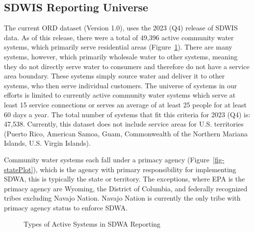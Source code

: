 \documentclass[12pt]{article}
\begin{document}
\subsection{SDWIS Reporting Universe}\label{sdwis-reporting-universe}

The current ORD dataset (Version 1.0), uses the 2023 (Q4) release of
SDWIS data. As of this release, there were a total of 49,396 active
community water systems, which primarily serve residential areas
(Figure~\ref{fig-systemType}). There are many systems, however, which
primarily wholesale water to other systems, meaning they do not directly
serve water to consumers and therefore do not have a service area
boundary. These systems simply source water and deliver it to other
systems, who then serve individual customers. The universe of systems in
our efforts is limited to currently active community water systems which
serve at least 15 service connections or serves an average of at least
25 people for at least 60 days a year. The total number of systems that
fit this criteria for 2023 (Q4) is: 47,538. Currently, this dataset does
not include service areas for U.S. territories (Puerto Rico, American
Samoa, Guam, Commonwealth of the Northern Mariana Islands, U.S. Virgin
Islands).

Community water systems each fall under a primacy agency
(Figure~\ref{fig-statePlot}), which is the agency with primary
responsibility for implementing SDWA, this is typically the state or
territory. The exceptions, where EPA is the primacy agency are Wyoming,
the District of Columbia, and federally recognized tribes excluding
Navajo Nation. Navajo Nation is currently the only tribe with primacy
agency status to enforce SDWA.

\begin{figure}


\caption{\label{fig-systemType}Types of Active Systems in SDWA
Reporting}

\end{figure}%
\end{document}
